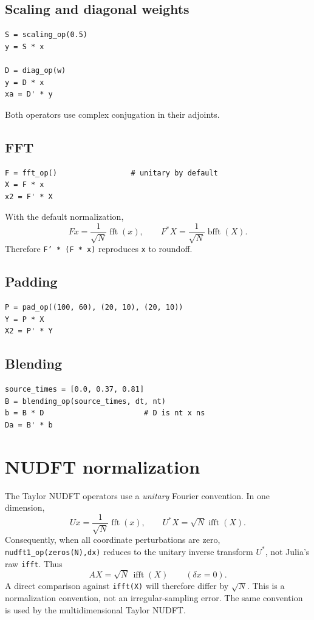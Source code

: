 \documentclass[11pt]{article}
\begin{document}
\subsection{Scaling and diagonal weights}
\begin{verbatim}
S = scaling_op(0.5)
y = S * x

D = diag_op(w)
y = D * x
xa = D' * y
\end{verbatim}
Both operators use complex conjugation in their adjoints.

\subsection{FFT}
\begin{verbatim}
F = fft_op()                 # unitary by default
X = F * x
x2 = F' * X
\end{verbatim}
With the default normalization,
\[
  Fx = \frac{1}{\sqrt{N}}\operatorname{fft}(x),\qquad
  F^*X = \frac{1}{\sqrt{N}}\operatorname{bfft}(X).
\]
Therefore \texttt{F' * (F * x)} reproduces \texttt{x} to roundoff.

\subsection{Padding}
\begin{verbatim}
P = pad_op((100, 60), (20, 10), (20, 10))
Y = P * X
X2 = P' * Y
\end{verbatim}

\subsection{Blending}
\begin{verbatim}
source_times = [0.0, 0.37, 0.81]
B = blending_op(source_times, dt, nt)
b = B * D                       # D is nt x ns
Da = B' * b
\end{verbatim}

\section{NUDFT normalization}
The Taylor NUDFT operators use a \emph{unitary} Fourier convention.  In one
dimension,
\[
  Ux = \frac{1}{\sqrt{N}}\operatorname{fft}(x),\qquad
  U^*X = \sqrt{N}\operatorname{ifft}(X).
\]
Consequently, when all coordinate perturbations are zero,
\texttt{nudft1\_op(zeros(N),dx)} reduces to the unitary inverse transform
$U^*$, not Julia's raw \texttt{ifft}.  Thus
\[
  A X = \sqrt{N}\,\operatorname{ifft}(X)
  \qquad (\delta x=0).
\]
A direct comparison against \texttt{ifft(X)} will therefore differ by
$\sqrt{N}$.  This is a normalization convention, not an irregular-sampling
error.  The same convention is used by the multidimensional Taylor NUDFT.
\end{document}
